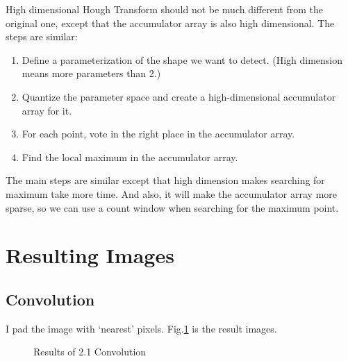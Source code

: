 \documentclass[
  course = {{16-720B Computer Vision}},
  quartile = {{1}},
  assignment = 1-Hough\ Transform,
  name = {{Kangle Deng}},
  email = {{kangled@andrew.cmu.edu}},
  firstexercise = 1
]{aga-homework}
\begin{document}
\subexercise
High dimensional Hough Transform should not be much different from the original one, except that the accumulator array is also high dimensional. The steps are similar:
\begin{enumerate}
    \item Define a parameterization of the shape we want to detect. (High dimension means more parameters than 2.)
    \item Quantize the parameter space and create a high-dimensional accumulator array for it.
    \item For each point, vote in the right place in the accumulator array.
    \item Find the local maximum in the accumulator array.
\end{enumerate}

The main steps are similar except that high dimension makes searching for maximum take more time. And also, it will make the accumulator array more sparse, so we can use a count window when searching for the maximum point. 

\section{Resulting Images}
\subsection{Convolution}
I pad the image with `nearest' pixels. Fig.\ref{fig:convolution} is the result images.

\begin{figure}
    \centering

    \caption{Results of 2.1 Convolution}
    \label{fig:convolution}
\end{figure}
\end{document}
